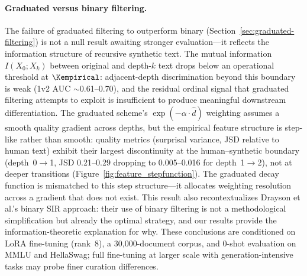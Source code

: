 
\paragraph{Graduated versus binary filtering.}
The failure of graduated filtering to outperform binary
(Section~\ref{sec:graduated-filtering}) is not a null result awaiting
stronger evaluation---it reflects the information structure of recursive
synthetic text.
The mutual information $I(X_0; X_k)$ between original and
depth-$k$ text drops below an operational threshold at $\Kempirical$:
adjacent-depth discrimination beyond this boundary is weak (1v2 AUC
$\sim$0.61--0.70), and the residual ordinal signal that graduated
filtering attempts to exploit is insufficient to produce meaningful
downstream differentiation.
The graduated scheme's $\exp(-\alpha \cdot \hat{d})$ weighting assumes
a smooth quality gradient across depths, but the empirical feature
structure is step-like rather than smooth: quality metrics (surprisal
variance, JSD relative to human text) exhibit their largest discontinuity
at the human--synthetic boundary (depth~0$\to$1, JSD 0.21--0.29 dropping
to 0.005--0.016 for depth~1$\to$2), not at deeper transitions
(Figure~\ref{fig:feature_stepfunction}).
The graduated decay function is mismatched to this step structure---it
allocates weighting resolution across a gradient that does not exist.
This result also recontextualizes Drayson et al.'s binary SIR approach:
their use of binary filtering is not a methodological simplification
but already the optimal strategy, and our results provide the
information-theoretic explanation for why.
These conclusions are conditioned on LoRA fine-tuning (rank~8),
a 30{,}000-document corpus, and 0-shot evaluation on MMLU and
HellaSwag; full fine-tuning at larger scale with generation-intensive
tasks may probe finer curation differences.
